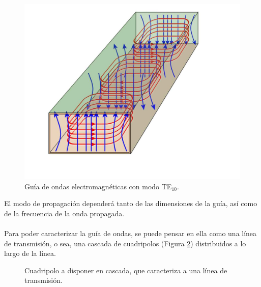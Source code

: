 \documentclass[11pt,a4paper]{article}
\begin{document}
\begin{multicols}{2}
\begin{figure}[H]
    \includegraphics[scale=0.15]{Images/TE10.jpg}
    \caption{Guía de ondas electromagnéticas con modo TE$_{10}$.}
    \label{fig:te10}
\end{figure}
El modo de propagación dependerá tanto de las dimensiones de la guía, así como de la frecuencia de la onda propagada. \\ \\
Para poder caracterizar la guía de ondas, se puede pensar en ella como una línea de transmisión, o sea, una cascada de cuadripolos (Figura \ref{fig:cuadri}) distribuidos a lo largo de la línea.
\begin{figure}[H]
\centering
{}
\caption{Cuadripolo a disponer en cascada, que caracteriza a una línea de transmisión.}\label{fig:cuadri}
\end{figure}




\end{multicols}
\end{document}
